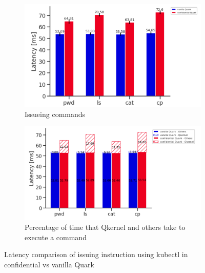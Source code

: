 \begin{figure}[!htb] 
    \begin{subfigure}[b]{0.5\linewidth}
      \centering
      \includegraphics[width=1\textwidth]{images/speed_of_issuing_cmd_in_cquark_upstream_quark.PNG} %
      \caption{Issueing commands}
      \label{fig:speed_of_issuing_cmd_in_cquark_upstream_quark}
      \vspace{4ex}
    \end{subfigure}%
    \begin{subfigure}[b]{0.5\linewidth}
      \centering
      \includegraphics[width=1\textwidth]{images/timeshare_issuing_cmd_in_cquark_upstream_quark_kubectl.png} %
        \caption{Percentage of time that Qkernel and others take to execute a command}
        \label{fig:timeshare_issuing_cmd_in_cquark_upstream_quark_kubectl}
      \vspace{4ex}
    \end{subfigure} 
    \caption{Latency comparison of issuing instruction using kubectl in confidential vs vanilla Quark}
    \label{fig8} 
\end{figure}


